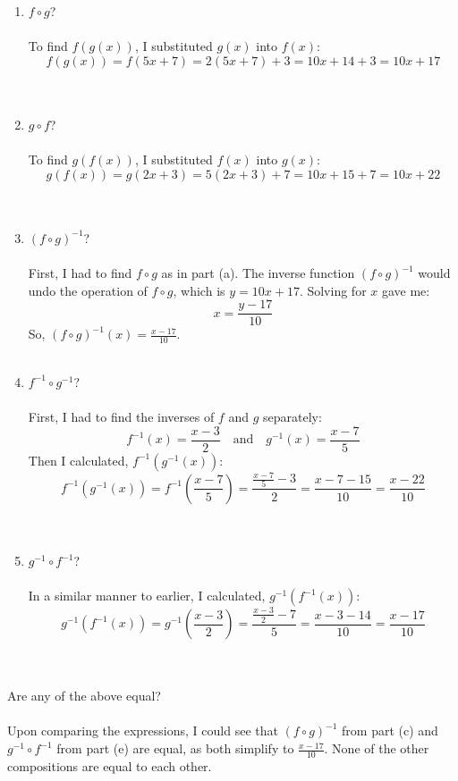 \documentclass{amsart}
\theoremstyle{definition}
\theoremstyle{Exercise}
\theoremstyle{remark}
\theoremstyle{rule}
\numberwithin{equation}{section}
\begin{document}
\begin{enumerate}[label=(\alph*)]
\item  $f\circ g$?\\\\
To find \( f(g(x)) \), I substituted \( g(x) \) into \( f(x) \):
\[ f(g(x)) = f(5x + 7) = 2(5x + 7) + 3 = 10x + 14 + 3 = 10x + 17 \]
\\\\
\item  $g \circ f$?\\\\
To find \( g(f(x)) \), I substituted \( f(x) \) into \( g(x) \):
\[ g(f(x)) = g(2x + 3) = 5(2x + 3) + 7 = 10x + 15 + 7 = 10x + 22 \]
\\\\
\item  $(f\circ g)^{-1}$?\\\\
First, I had to find \( f \circ g \) as in part (a). The inverse function \( (f \circ g)^{-1} \) would undo the operation of \( f \circ g \), which is \( y = 10x + 17 \). Solving for \( x \) gave me:
\[ x = \frac{y - 17}{10} \]
So, \( (f \circ g)^{-1}(x) = \frac{x - 17}{10} \).
\\\\
\item  $f^{-1}\circ g^{-1}$?\\\\
First, I had to find the inverses of \( f \) and \( g \) separately:
\[ f^{-1}(x) = \frac{x - 3}{2} \quad \text{and} \quad g^{-1}(x) = \frac{x - 7}{5} \]
Then I calculated, \( f^{-1}(g^{-1}(x)) \):
\[ f^{-1}(g^{-1}(x)) = f^{-1}\left(\frac{x - 7}{5}\right) = \frac{\frac{x - 7}{5} - 3}{2} = \frac{x - 7 - 15}{10} = \frac{x - 22}{10} \]
\\\\
\item  $g^{-1}\circ f^{-1}$?\\\\
In a similar manner to earlier, I calculated, \( g^{-1}(f^{-1}(x)) \):
\[ g^{-1}(f^{-1}(x)) = g^{-1}\left(\frac{x - 3}{2}\right) = \frac{\frac{x - 3}{2} - 7}{5} = \frac{x - 3 - 14}{10} = \frac{x - 17}{10} \]
\\\\
\end{enumerate}
Are any of the above equal?\\\\
Upon comparing the expressions, I could see that \( (f \circ g)^{-1} \) from part (c) and \( g^{-1} \circ f^{-1} \) from part (e) are equal, as both simplify to \( \frac{x - 17}{10} \). None of the other compositions are equal to each other.
\\\\
\end{document}
